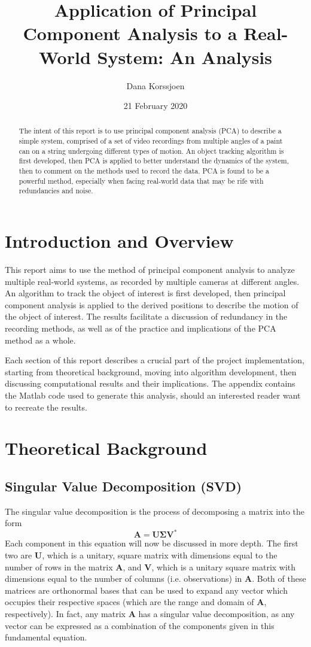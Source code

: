 \documentclass[a4paper,10 pt]{article}
\title{Application of Principal Component Analysis to a Real-World System: An Analysis}
\author{Dana Korssjoen}
\date{21 February 2020}
\begin{document}
\maketitle
\begin{abstract}
    The intent of this report is to use principal component analysis (PCA) to describe a simple system, comprised of a set of video recordings from multiple angles of a paint can on a string undergoing different types of motion. An object tracking algorithm is first developed, then PCA is applied to better understand the dynamics of the system, then to comment on the methods used to record the data. PCA is found to be a powerful method, especially when facing real-world data that may be rife with redundancies and noise.
\end{abstract}
\section{Introduction and Overview}
This report aims to use the method of principal component analysis to analyze multiple real-world systems, as recorded by multiple cameras at different angles. An algorithm to track the object of interest is first developed, then principal component analysis is applied to the derived positions to describe the motion of the object of interest. The results facilitate a discussion of redundancy in the recording methods, as well as of the practice and implications of the PCA method as a whole.

Each section of this report describes a crucial part of the project implementation, starting from theoretical background, moving into algorithm development, then discussing computational results and their implications. The appendix contains the Matlab code used to generate this analysis, should an interested reader want to recreate the results.

\section{Theoretical Background}
\subsection{Singular Value Decomposition (SVD)}
The singular value decomposition is the process of decomposing a matrix into the form \begin{equation}
    \mathbf{A} = \mathbf{U\Sigma V^*}
\end{equation}
Each component in this equation will now be discussed in more depth. The first two are $\mathbf{U}$, which is a unitary, square matrix with dimensions equal to the number of rows in the matrix $\mathbf{A}$, and $\mathbf{V}$, which is a unitary square matrix with dimensions equal to the number of columns (i.e. observations) in $\mathbf{A}$. Both of these matrices are orthonormal bases that can be used to expand any vector which occupies their respective spaces (which are the range and domain of $\mathbf{A}$, respectively). In fact, any matrix $\mathbf{A}$ has a singular value decomposition, as any vector can be expressed as a combination of the components given in this fundamental equation.
\end{document}
